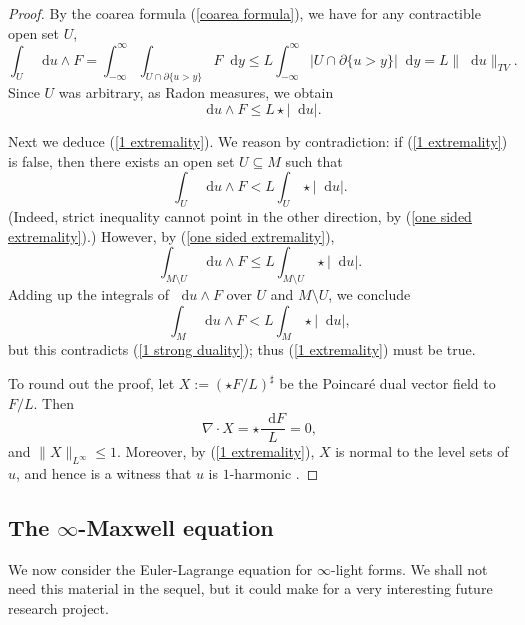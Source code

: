 \documentclass[reqno,11pt]{amsart}
\newcommand*\dif{\mathop{}\!\mathrm{d}}
\theoremstyle{definition}
\numberwithin{equation}{section}
\begin{document}
\begin{proof}
By the coarea formula (\ref{coarea formula}), we have for any contractible open set $U$,
$$\int_U \dif u \wedge F = \int_{-\infty}^\infty \int_{U \cap \partial \{u > y\}} F \dif y \leq L \int_{-\infty}^\infty |U \cap \partial \{u > y\}| \dif y = L \|\dif u\|_{TV}.$$
Since $U$ was arbitrary, as Radon measures, we obtain
\begin{equation}\label{one sided extremality}
\dif u \wedge F \leq L \star |\dif u|.
\end{equation}

Next we deduce (\ref{1 extremality}).
We reason by contradiction: if (\ref{1 extremality}) is false, then there exists an open set $U \subseteq M$ such that 
$$\int_U \dif u \wedge F < L \int_U \star |\dif u|.$$
(Indeed, strict inequality cannot point in the other direction, by (\ref{one sided extremality}).)
However, by (\ref{one sided extremality}), 
$$\int_{M \setminus U} \dif u \wedge F \leq L \int_{M \setminus U} \star |\dif u|.$$
Adding up the integrals of $\dif u \wedge F$ over $U$ and $M \setminus U$, we conclude 
$$\int_M \dif u \wedge F < L \int_M \star |\dif u|,$$
but this contradicts (\ref{1 strong duality}); thus (\ref{1 extremality}) must be true.

To round out the proof, let $X := (\star F/L)^\sharp$ be the Poincar\'e dual vector field to $F/L$. Then
$$\nabla \cdot X = \star \frac{\dif F}{L} = 0,$$
and $\|X\|_{L^\infty} \leq 1$.
Moreover, by (\ref{1 extremality}), $X$ is normal to the level sets of $u$, and hence is a witness that $u$ is $1$-harmonic \cite{Mazon14}.
\end{proof}

\subsection{The \texorpdfstring{$\infty$-Maxwell equation}{infinity-Maxwell equation}}
We now consider the Euler-Lagrange equation for $\infty$-light forms.
We shall not need this material in the sequel, but it could make for a very interesting future research project.
\end{document}
